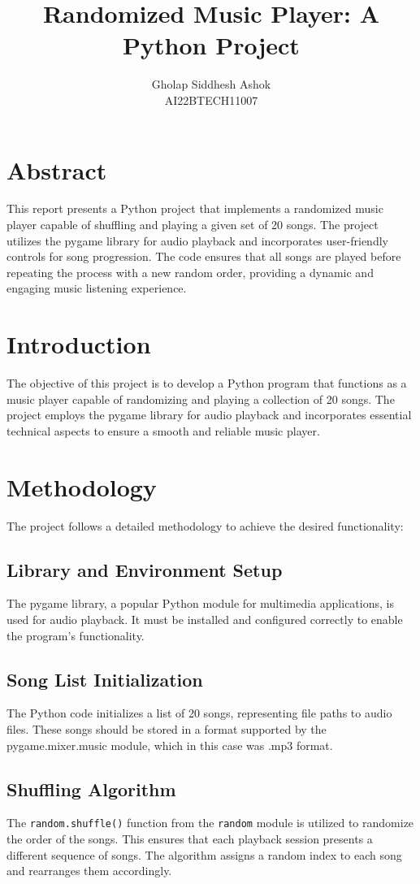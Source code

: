 \documentclass{article}
\title{Randomized Music Player: A Python Project}
\author{Gholap Siddhesh Ashok\\AI22BTECH11007}
\begin{document}
\maketitle

\section*{Abstract}
This report presents a Python project that implements a randomized music player capable of shuffling and playing a given set of 20 songs. The project utilizes the pygame library for audio playback and incorporates user-friendly controls for song progression. The code ensures that all songs are played before repeating the process with a new random order, providing a dynamic and engaging music listening experience.

\section{Introduction}
The objective of this project is to develop a Python program that functions as a music player capable of randomizing and playing a collection of 20 songs. The project employs the pygame library for audio playback and incorporates essential technical aspects to ensure a smooth and reliable music player.

\section{Methodology}
The project follows a detailed methodology to achieve the desired functionality:

\subsection{Library and Environment Setup}
The pygame library, a popular Python module for multimedia applications, is used for audio playback. It must be installed and configured correctly to enable the program's functionality.

\subsection{Song List Initialization}
The Python code initializes a list of 20 songs, representing file paths to audio files. These songs should be stored in a format supported by the pygame.mixer.music module, which in this case was .mp3 format.

\subsection{Shuffling Algorithm}
The \texttt{random.shuffle()} function from the \texttt{random} module is utilized to randomize the order of the songs. This ensures that each playback session presents a different sequence of songs. The algorithm assigns a random index to each song and rearranges them accordingly.
\end{document}
